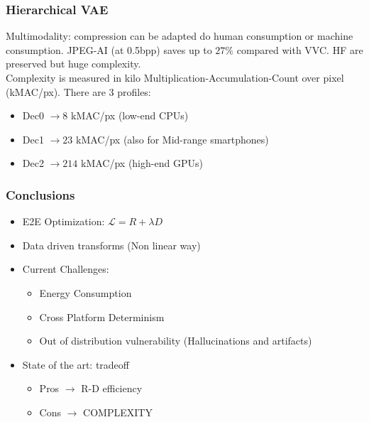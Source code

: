 \subsubsection{Hierarchical VAE}
Multimodality: compression can be adapted do human consumption or machine consumption. JPEG-AI (at 0.5bpp) saves up to $27\%$ compared with VVC. HF are preserved but huge complexity.\\
Complexity is measured in kilo Multiplication-Accumulation-Count over pixel (kMAC/px). There are 3 profiles:
\begin{itemize}
    \item Dec0 $\to 8$ kMAC/px (low-end CPUs)
    \item Dec1 $\to 23$ kMAC/px (also for Mid-range smartphones)
    \item Dec2 $\to 214$ kMAC/px (high-end GPUs)
\end{itemize}
\subsubsection{Conclusions}
\begin{itemize}
    \item E2E Optimization: $\mathcal{L} = R+\lambda D$
    \item Data driven transforms (Non linear way)
    \item Current Challenges:
    \begin{itemize}
        \item Energy Consumption
        \item Cross Platform Determinism
        \item Out of distribution vulnerability (Hallucinations and artifacts)
    \end{itemize}
    \item State of the art: tradeoff
    \begin{itemize}
        \item Pros $\to$ R-D efficiency
        \item Cons $\to$ COMPLEXITY
    \end{itemize}
\end{itemize}
